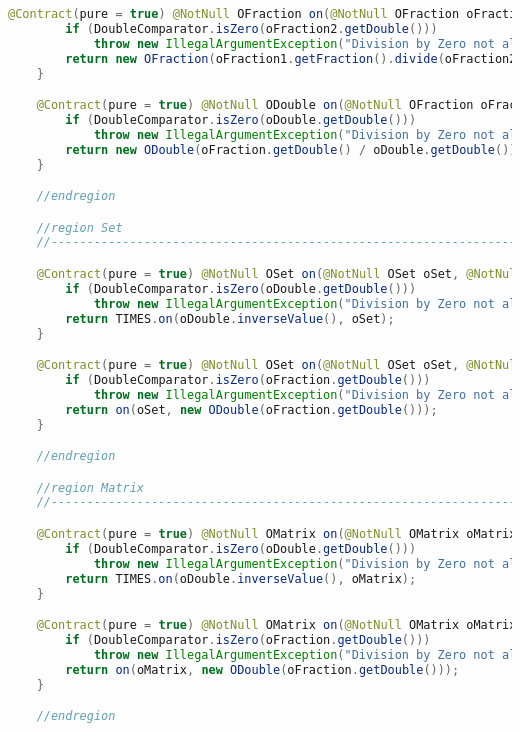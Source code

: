 \begin{lstlisting}[caption=Slash (Schwenke),label=list:Slash,language=Java]
    @Contract(pure = true) @NotNull OFraction on(@NotNull OFraction oFraction1, @NotNull OFraction oFraction2) {
        if (DoubleComparator.isZero(oFraction2.getDouble()))
            throw new IllegalArgumentException("Division by Zero not allowed");
        return new OFraction(oFraction1.getFraction().divide(oFraction2.getFraction()));
    }

    @Contract(pure = true) @NotNull ODouble on(@NotNull OFraction oFraction, @NotNull ODouble oDouble) {
        if (DoubleComparator.isZero(oDouble.getDouble()))
            throw new IllegalArgumentException("Division by Zero not allowed");
        return new ODouble(oFraction.getDouble() / oDouble.getDouble());
    }

    //endregion

    //region Set
    //------------------------------------------------------------------------------------

    @Contract(pure = true) @NotNull OSet on(@NotNull OSet oSet, @NotNull ODouble oDouble) {
        if (DoubleComparator.isZero(oDouble.getDouble()))
            throw new IllegalArgumentException("Division by Zero not allowed");
        return TIMES.on(oDouble.inverseValue(), oSet);
    }

    @Contract(pure = true) @NotNull OSet on(@NotNull OSet oSet, @NotNull OFraction oFraction) {
        if (DoubleComparator.isZero(oFraction.getDouble()))
            throw new IllegalArgumentException("Division by Zero not allowed");
        return on(oSet, new ODouble(oFraction.getDouble()));
    }

    //endregion

    //region Matrix
    //------------------------------------------------------------------------------------

    @Contract(pure = true) @NotNull OMatrix on(@NotNull OMatrix oMatrix, @NotNull ODouble oDouble) {
        if (DoubleComparator.isZero(oDouble.getDouble()))
            throw new IllegalArgumentException("Division by Zero not allowed");
        return TIMES.on(oDouble.inverseValue(), oMatrix);
    }

    @Contract(pure = true) @NotNull OMatrix on(@NotNull OMatrix oMatrix, @NotNull OFraction oFraction) {
        if (DoubleComparator.isZero(oFraction.getDouble()))
            throw new IllegalArgumentException("Division by Zero not allowed");
        return on(oMatrix, new ODouble(oFraction.getDouble()));
    }

    //endregion


\end{lstlisting}
